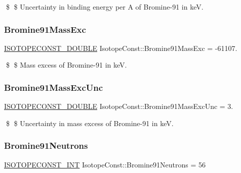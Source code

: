 \$ \$ Uncertainty in binding energy per A of Bromine-\/91 in keV. \mbox{\label{group___isotope_const-_bromine-_br91_ga81c374a3db537bea8c95ec8976491759}} 
\subsubsection{\texorpdfstring{Bromine91\+Mass\+Exc}{Bromine91MassExc}}
{\footnotesize\ttfamily \mbox{\hyperlink{group___isotope_const-_macros_ga8f45a7272ce02c0b4c65c44636ed719a}{I\+S\+O\+T\+O\+P\+E\+C\+O\+N\+S\+T\+\_\+\+D\+O\+U\+B\+LE}} Isotope\+Const\+::\+Bromine91\+Mass\+Exc = -\/61107.}

\$ \$ Mass excess of Bromine-\/91 in keV. \mbox{\label{group___isotope_const-_bromine-_br91_ga6cea7abd4e29b933af68741b25c5932c}} 
\subsubsection{\texorpdfstring{Bromine91\+Mass\+Exc\+Unc}{Bromine91MassExcUnc}}
{\footnotesize\ttfamily \mbox{\hyperlink{group___isotope_const-_macros_ga8f45a7272ce02c0b4c65c44636ed719a}{I\+S\+O\+T\+O\+P\+E\+C\+O\+N\+S\+T\+\_\+\+D\+O\+U\+B\+LE}} Isotope\+Const\+::\+Bromine91\+Mass\+Exc\+Unc = 3.}

\$ \$ Uncertainty in mass excess of Bromine-\/91 in keV. \mbox{\label{group___isotope_const-_bromine-_br91_ga0d3563fbf6da865fd8ed6aad7cd535a3}} 
\subsubsection{\texorpdfstring{Bromine91\+Neutrons}{Bromine91Neutrons}}
{\footnotesize\ttfamily \mbox{\hyperlink{group___isotope_const-_macros_ga5f18360b3e99483a35c32d789e62621c}{I\+S\+O\+T\+O\+P\+E\+C\+O\+N\+S\+T\+\_\+\+I\+NT}} Isotope\+Const\+::\+Bromine91\+Neutrons = 56}

